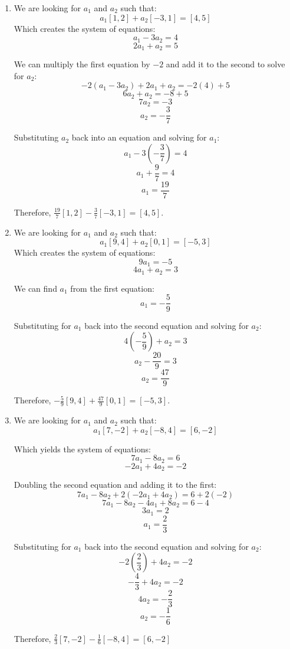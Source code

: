 \begin{Answer}[ref = combo]
\begin{enumerate}
    \item We are looking for $a_1$ and $a_2$ such that:
    $$a_1 \left[ 1, 2 \right] + a_2 \left[ -3, 1 \right] = \left[ 4, 5 
    \right]$$
    Which creates the system of equations:
    $$a_1 - 3 a_2 = 4$$
    $$2 a_1 + a_2 = 5$$

    We can multiply the first equation by $-2$ and add it to the second to 
    solve for $a_2$:
    $$-2 \left( a_1 - 3 a_2 \right) + 2 a_1 + a_2 = -2 \left( 4 \right) + 5$$
    $$6 a_2 + a_2 = -8 + 5$$
    $$7 a_2 = -3$$
    $$a_2 = -\frac{3}{7}$$

    Substituting $a_2$ back into an equation and solving for $a_1$:
    $$a_1 - 3 \left( -\frac{3}{7} \right) = 4$$
    $$a_1 + \frac{9}{7} = 4$$
    $$a_1 = \frac{19}{7}$$

    Therefore, $\frac{19}{7} \left[ 1, 2 \right] - \frac{3}{7} \left[ -3, 1 
    \right] = \left[ 4, 5 \right]$.

    \item We are looking for $a_1$ and $a_2$ such that:
    $$a_1 \left[ 9, 4 \right] + a_2 \left[ 0, 1 \right] = \left[ -5, 3 \right]$$
    Which creates the system of equations:
    $$9 a_1 = -5$$
    $$4 a_1 + a_2 = 3$$

    We can find $a_1$ from the first equation:
    $$a_1 = -\frac{5}{9}$$

    Substituting for $a_1$ back into the second equation and solving for $a_2$:
    $$4 \left( -\frac{5}{9} \right) + a_2 = 3$$
    $$a_2 - \frac{20}{9} = 3$$
    $$a_2 = \frac{47}{9}$$

    Therefore, $-\frac{5}{9} \left[ 9, 4 \right] + \frac{47}{9} \left[ 0, 1 
    \right] = \left[ -5, 3 \right]$.

    \item We are looking for $a_1$ and $a_2$ such that:
    $$a_1 \left[ 7, -2 \right] + a_2 \left[ -8, 4 \right] = \left[ 6, -2 
    \right]$$

    Which yields the system of equations:
    $$7 a_1 - 8 a_2 = 6$$
    $$-2 a_1 + 4 a_2 = -2$$

    Doubling the second equation and adding it to the first:
    $$7 a_1 - 8 a_2 + 2 \left( -2 a_1 + 4 a_2 \right) = 6 + 2 \left( -2 
    \right)$$
    $$7 a_1 - 8 a_2 - 4 a_1 + 8 a_2 = 6 - 4$$
    $$3 a_1 = 2$$
    $$a_1 = \frac{2}{3}$$

    Substituting for $a_1$ back into the second equation and solving for $a_2$:
    $$-2 \left( \frac{2}{3} \right) + 4 a_2 = -2$$
    $$-\frac{4}{3} + 4 a_2 = -2$$
    $$4 a_2 = -\frac{2}{3}$$
    $$a_2 = -\frac{1}{6}$$

    Therefore, $\frac{2}{3} \left[ 7, -2 \right] - \frac{1}{6} \left[ -8, 4 
    \right] = \left[ 6, -2 \right]$
\end{enumerate}
\end{Answer} 

